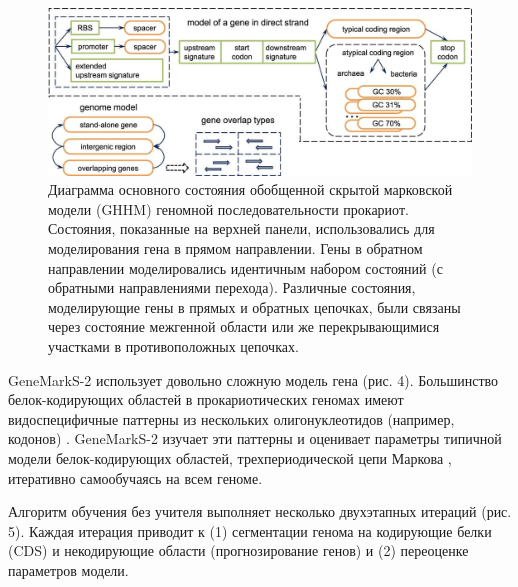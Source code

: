\documentclass[14pt]{extarticle}
\begin{document}
    \begin{figure}[]
            \centering
            \includegraphics[width=\textwidth]{img/gms2_1.jpg}
            \caption{Диаграмма основного состояния обобщенной скрытой марковской модели (GHHM) геномной 
            последовательности прокариот. Состояния, показанные на верхней панели, использовались для моделирования гена
            в прямом направлении. Гены в обратном направлении моделировались идентичным набором состояний (с обратными 
            направлениями перехода). Различные состояния, моделирующие гены в прямых и обратных цепочках, были связаны 
            через состояние межгенной области или же перекрывающимися участками в противоположных цепочках. 
            \cite{lomsad}}
            \label{fig:skybox}
    \end{figure}
    
    \par{GeneMarkS-2 использует довольно сложную модель гена (рис. 4). Большинство белок-кодирующих областей в 
    прокариотических геномах имеют видоспецифичные паттерны из нескольких олигонуклеотидов (например, кодонов)
    \cite{fickett}. GeneMarkS-2 изучает эти паттерны и оценивает параметры типичной модели белок-кодирующих областей, 
    трехпериодической цепи Маркова \cite{bordov2}, итеративно самообучаясь на всем геноме.}
    
    
    \par{Алгоритм обучения без учителя выполняет несколько двухэтапных итераций (рис. 5). Каждая итерация приводит к (1)
    сегментации генома на кодирующие белки (CDS) и некодирующие области (прогнозирование генов) и (2) переоценке 
    параметров модели.}
    
\end{document}
